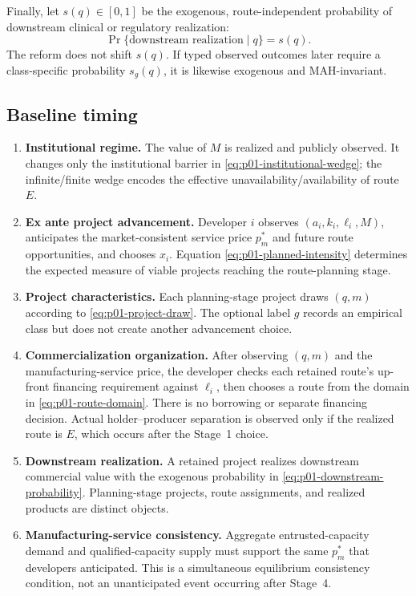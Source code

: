 Finally, let \(s(q)\in[0,1]\) be the exogenous, route-independent probability
of downstream clinical or regulatory realization:
\begin{equation}
  \Pr\{\text{downstream realization}\mid q\}=s(q).
  \label{eq:p01-downstream-probability}
\end{equation}
The reform does not shift \(s(q)\).  If typed observed outcomes later require a
class-specific probability \(s_g(q)\), it is likewise exogenous and
MAH-invariant.

\subsection{Baseline timing}
\label{subsec:p01-timing}

\begin{enumerate}
  \item[Stage 0.] \textbf{Institutional regime.}  The value of \(M\) is
  realized and publicly observed.  It changes only the institutional barrier
  in \eqref{eq:p01-institutional-wedge}; the infinite/finite wedge encodes the
  effective unavailability/availability of route \(E\).

  \item[Stage 1.] \textbf{Ex ante project advancement.}  Developer \(i\)
  observes \((a_i,k_i,\ell_i,M)\), anticipates the market-consistent service price
  \(p_m^*\) and future route opportunities, and chooses \(x_i\).  Equation
  \eqref{eq:p01-planned-intensity} determines the expected measure of viable
  projects reaching the route-planning stage.

  \item[Stage 2.] \textbf{Project characteristics.}  Each planning-stage
  project draws \((q,m)\) according to \eqref{eq:p01-project-draw}.  The
  optional label \(g\) records an empirical class but does not create another
  advancement choice.

  \item[Stage 3.] \textbf{Commercialization organization.}  After observing
  \((q,m)\) and the manufacturing-service price, the developer checks each
  retained route's up-front financing requirement against \(\ell_i\), then
  chooses a route from the domain in \eqref{eq:p01-route-domain}. There is no
  borrowing or separate financing decision. Actual holder--producer
  separation is observed only if the realized route is \(E\), which occurs
  after the Stage~1 choice.

  \item[Stage 4.] \textbf{Downstream realization.}  A retained project
  realizes downstream commercial value with the exogenous probability in
  \eqref{eq:p01-downstream-probability}.  Planning-stage projects, route
  assignments, and realized products are distinct objects.

  \item[Stage 5.] \textbf{Manufacturing-service consistency.}  Aggregate
  entrusted-capacity demand and qualified-capacity supply must support the same
  \(p_m^*\) that developers anticipated.  This is a simultaneous equilibrium
  consistency condition, not an unanticipated event occurring after Stage~4.
\end{enumerate}

